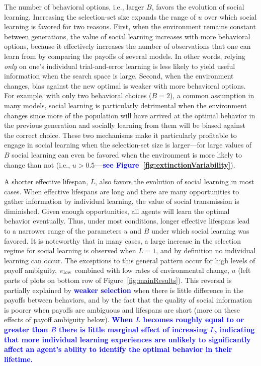 \documentclass[letterpaper,11.5pt]{scrartcl}
\newcommand{\cm}[1]{{\textcolor{mypurple} {({\tiny CM:} #1)}}}
\newcommand{\edit}[1]{{\bfseries \textcolor{blue} {#1}}}
\begin{document}
The number of behavioral options, i.e., larger $B$, favors the evolution of social learning. Increasing the selection-set size
expands the range of $u$ over which social learning is favored for two reasons. First, when the environment remains constant between
generations, the value of social learning increases with more behavioral options, because it effectively increases the number of
observations that one can learn from by comparing the payoffs of several models. In other words, relying \emph{only} on one's
individual trial-and-error learning is less likely to yield useful information when the search space is
large. Second, when the environment changes, bias against the new optimal is weaker with more behavioral
options. For example, with only two behavioral choices ($B = 2$), a common assumption in many models, social
learning is particularly detrimental when the environment changes since more of the population will have
arrived at the optimal behavior in the previous generation and socially learning from them will be biased
against the correct choice. These two mechanisms make it particularly profitable to engage in social
learning when the selection-set size is larger---for large values of $B$ social learning can even be favored
when the environment is more likely to change than not (i.e.,
$u>0.5$\edit{---see Figure~\ref{fig:extinctionVariability}}). 

A shorter effective lifespan, $L$, also favors the evolution of social learning in
most cases. When effective lifespans are long and there are many opportunities to
gather information by individual learning, the value of social transmission is
diminished. Given enough opportunities, all agents will learn the optimal behavior
eventually. Thus, under most conditions, longer effective lifespans lead to a
narrower range of the parameters $u$ and $B$ under which social learning was
favored. It is noteworthy that in many cases, a large increase in the selection
regime for social learning is observed when $L=1$, and by definition no individual
learning can occur. The exceptions to this general pattern occur for high levels of
payoff ambiguity, $\pi_{\mathrm{low}}$ combined with low rates of environmental change, $u$
(left parts of plots on bottom row of Figure~\ref{fig:mainResults}). This reversal
is partially explained by \edit{weaker selection} when there is little difference in the payoffs between
behaviors, and by the fact that the quality of social information is poorer when payoffs are ambiguous and
lifespans are short (more on these effects of payoff ambiguity below).  
\edit{When $L$ becomes roughly equal to or greater than $B$ there is little marginal effect of increasing $L$, indicating that more individual learning experiences are unlikely to significantly affect an agent's ability to identify the optimal behavior in their lifetime.}
\end{document}
